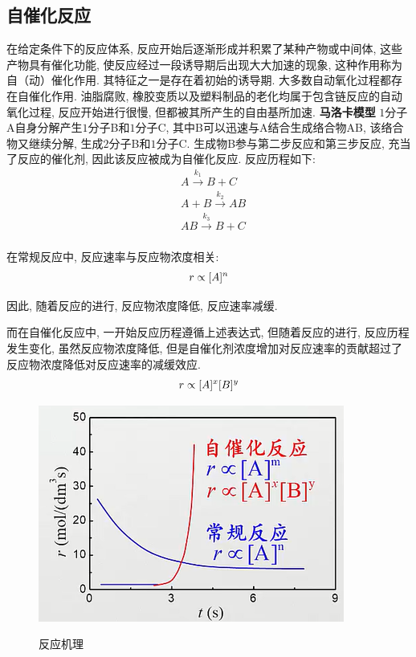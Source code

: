 \documentclass[a4paper]{article}
\begin{document}
\subsection{自催化反应}
在给定条件下的反应体系, 反应开始后逐渐形成并积累了某种产物或中间体, 这些产物具有催化功能, 
使反应经过一段诱导期后出现大大加速的现象, 这种作用称为自（动）催化作用. 其特征之一是存在着初始的诱导期. 
大多数自动氧化过程都存在自催化作用. 油脂腐败, 橡胶变质以及塑料制品的老化均属于包含链反应的自动氧化过程, 
反应开始进行很慢, 但都被其所产生的自由基所加速.
\textbf{马洛卡模型}
$1$分子A自身分解产生$1$分子B和$1$分子C, 其中B可以迅速与A结合生成络合物AB, 该络合物又继续分解, 
生成$2$分子B和$1$分子C. 生成物B参与第二步反应和第三步反应, 充当了反应的催化剂, 
因此该反应被成为自催化反应. 反应历程如下:
\begin{equation}
	\begin{aligned}
		&A \stackrel{k_{1}}{\longrightarrow} B + C\\
		&A + B \stackrel{k_{2}}{\longrightarrow} AB\\
		&AB \stackrel{k_{3}}{\longrightarrow} B + C\\
	\end{aligned}
\end{equation}
\par
在常规反应中, 反应速率与反应物浓度相关:
\begin{equation}
r \propto [A]^{n}\\
\end{equation}
\par
因此, 随着反应的进行, 反应物浓度降低, 反应速率减缓.\par
而在自催化反应中, 一开始反应历程遵循上述表达式, 但随着反应的进行, 
反应历程发生变化, 虽然反应物浓度降低, 
但是自催化剂浓度增加对反应速率的贡献超过了反应物浓度降低对反应速率的减缓效应.\\
\begin{equation}
r \propto [A]^{x}[B]^{y}\\
\end{equation}
\begin{figure}[!h]
	\centering
	\includegraphics[width=0.30\paperwidth]{fig/mechanics.png}\\
	\caption{反应机理}\label{wf}
\end{figure}
\end{document}
